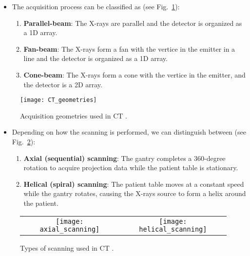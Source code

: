 \begin{itemize}
\item The acquisition process can be classified as
(see Fig.~\ref{fig:CT_geometries}):
\begin{enumerate}
\item \textbf{Parallel-beam}: The X-rays are parallel and the detector
  is organized as a 1D array.
\item \textbf{Fan-beam}: The X-rays form a fan with the vertice in the
  emitter in a line and the detector is organized as a 1D array.
\item \textbf{Cone-beam}: The X-rays form a cone with the
  vertice in the emitter, and the detector is a 2D array.
\end{enumerate}
\end{itemize}
\vspace{-5ex}
\begin{figure}[!b]
  \centering
  \texttt{[image: CT\_geometries]}
  \caption{Acquisition geometries used in CT \cite{takase2025CT}.\label{fig:CT_geometries}}
\end{figure}

\begin{itemize}
\item Depending on how the scanning is performed, we can distinguish between
(see Fig.~\ref{fig:scannings}):
\begin{enumerate}
\item \textbf{Axial (sequential) scanning}:
  The gantry completes a 360-degree rotation to acquire projection
  data while the patient table is stationary. 
\item \textbf{Helical (spiral) scanning}: The patient table moves
  at a constant speed while the gantry rotates, causing the X-rays
  source to form a helix around the patient.
\end{enumerate}
\end{itemize}
\begin{figure}[!b]
  \centering
  \begin{tabular}{cc}
    \texttt{[image: axial\_scanning]} & \texttt{[image: helical\_scanning]}
  \end{tabular}
  \caption{Types of scanning used in CT \cite{abdulla2025acquiring1}.\label{fig:scannings}}
\end{figure}

